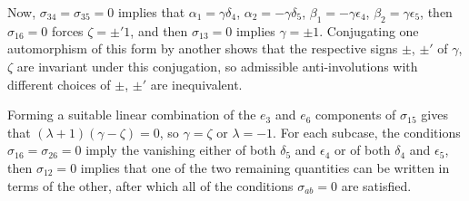 \documentclass[10pt,a4paper]{amsart}
\numberwithin{equation}{section}
\begin{document}
Now, $\sigma_{34} = \sigma_{35} = 0$ implies that $\alpha_1 = \gamma \delta_4$, $\alpha_2 = -\gamma \delta_5$, $\beta_1 = -\gamma \epsilon_4$, $\beta_2 = \gamma \epsilon_5$, then $\sigma_{16} = 0$ forces $\zeta = \pm' 1$, and then $\sigma_{13} = 0$ implies $\gamma = \pm 1$. Conjugating one automorphism of this form by another shows that the respective signs $\pm$, $\pm'$ of $\gamma$, $\zeta$ are invariant under this conjugation, so admissible anti-involutions with different choices of $\pm$, $\pm'$ are inequivalent.

Forming a suitable linear combination of the $e_3$ and $e_6$ components of $\sigma_{15}$ gives that $(\lambda + 1)(\gamma - \zeta) = 0$, so $\gamma = \zeta$ or $\lambda = -1$. For each subcase, the conditions $\sigma_{16} = \sigma_{26} = 0$ imply the vanishing either of both $\delta_5$ and $\epsilon_4$ or of both $\delta_4$ and $\epsilon_5$, then $\sigma_{12} = 0$ implies that one of the two remaining quantities can be written in terms of the other, after which all of the conditions $\sigma_{ab} = 0$ are satisfied.
\end{document}

